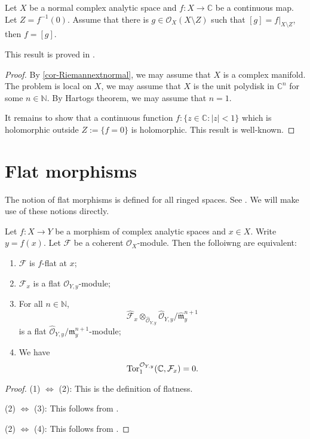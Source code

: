 \begin{proposition}\label{prop-Rado}
    Let $X$ be a normal complex analytic space and $f:X\rightarrow \mathbb{C}$ be a continuous map. Let $Z=f^{-1}(0)$. Assume that there is $g\in \mathcal{O}_X(X\setminus Z)$ such that $[g]=f|_{X\setminus Z}$, then $f=[g]$. 
\end{proposition}
This result is proved in \cite{Car52}.
\begin{proof}
    By \cref{cor-Riemannextnormal}, we may assume that $X$ is a complex manifold.
    The problem is local on $X$, we may assume that $X$ is the unit polydisk in $\mathbb{C}^n$ for some $n\in \mathbb{N}$. By Hartogs theorem, we may assume that $n=1$.

    It remains to show that a continuous function $f:\{z\in \mathbb{C}:|z|<1\}$ which  is holomorphic outside $Z:=\{f=0\}$ is holomorphic. This result is well-known.
 \end{proof}


 \section{Flat morphisms}
 The notion of flat morphisms is defined for all ringed spaces. See \cite[\href{https://stacks.math.columbia.edu/tag/02N2}{Tag 02N2}]{stacks-project}. We will make use of these notions directly.

 \begin{proposition}\label{prop-flatnesschar}
    Let $f:X\rightarrow Y$ be a morphism of complex analytic spaces and $x\in X$. Write $y=f(x)$. Let $\mathcal{F}$ be a coherent $\mathcal{O}_X$-module. Then the folloiwng are equivalent:
    \begin{enumerate}
        \item $\mathcal{F}$ is $f$-flat at $x$;
        \item $\mathcal{F}_x$ is a flat $\mathcal{O}_{Y,y}$-module;
        \item For all $n\in \mathbb{N}$, 
            \[
                \hat{\mathcal{F}}_x\otimes_{\hat{\mathcal{O}}_{Y,y}}\hat{\mathcal{O}}_{Y,y}/\hat{\mathfrak{m}}_y^{n+1}  
            \]
            is a flat $\hat{\mathcal{O}}_{Y,y}/\mathfrak{m}_y^{n+1}$-module;
        \item We have
            \[
                \operatorname{Tor}_1^{\mathcal{O}_{Y,y}}(\mathbb{C},\mathcal{F}_x)=0.
            \]
    \end{enumerate}
 \end{proposition}
 \begin{proof}
(1) $\Leftrightarrow$ (2): This is the definition of flatness.

(2) $\Leftrightarrow$ (3): This follows from \cite[\href{https://stacks.math.columbia.edu/tag/0523}{Tag 0523}]{stacks-project}.

(2) $\Leftrightarrow$ (4): This follows from \cite[\href{https://stacks.math.columbia.edu/tag/00MK}{Tag 00MK}]{stacks-project}.
 \end{proof}



